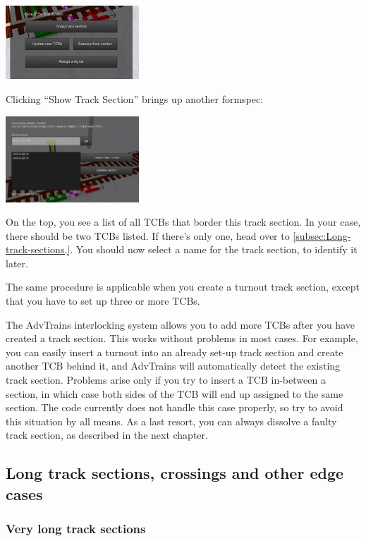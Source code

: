 \documentclass[english]{paper}
\begin{document}
\includegraphics[width=5cm]{3_home_moritz_Home_Projekte_Minetest_minetest_m____lyx_img_Bildschirmfoto_2018-08-30_14-27-25.png}

Clicking ``Show Track Section'' brings up another formspec:

\includegraphics[width=5cm]{4_home_moritz_Home_Projekte_Minetest_minetest_m____lyx_img_Bildschirmfoto_2018-08-30_14-28-32.png}

On the top, you see a list of all TCBs that border this track section.
In your case, there should be two TCBs listed. If there's only one,
head over to \ref{subsec:Long-track-sections,}. You should now select
a name for the track section, to identify it later.

The same procedure is applicable when you create a turnout track section,
except that you have to set up three or more TCBs.

The AdvTrains interlocking system allows you to add more TCBs after
you have created a track section. This works without problems in most
cases. For example, you can easily insert a turnout into an already
set-up track section and create another TCB behind it, and AdvTrains
will automatically detect the existing track section. Problems arise
only if you try to insert a TCB in-between a section, in which case
both sides of the TCB will end up assigned to the same section. The
code currently does not handle this case properly, so try to avoid
this situation by all means. As a last resort, you can always dissolve
a faulty track section, as described in the next chapter.

\subsection{Long track sections, crossings and other edge cases\label{subsec:Long-track-sections,}}

\subsubsection{Very long track sections}
\end{document}
